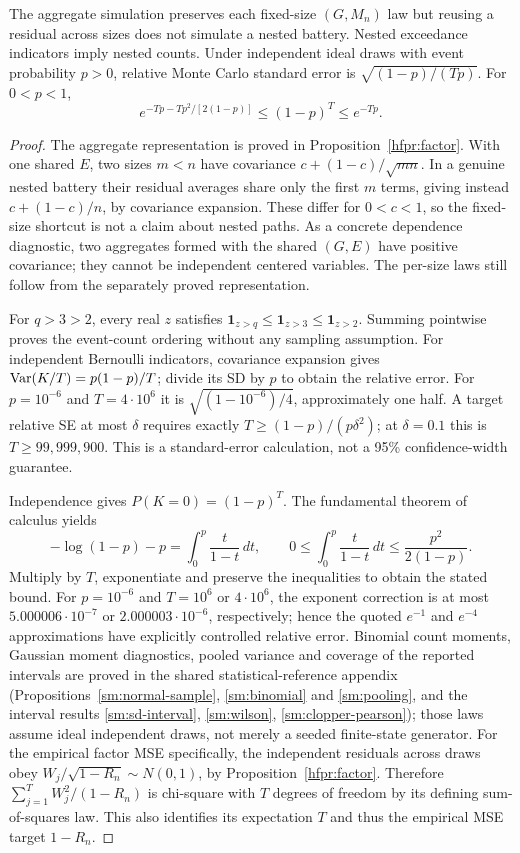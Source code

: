 \begin{proposition}
\label{hfpr:simulation}
The aggregate simulation preserves each fixed-size \((G,M_n)\) law but
reusing a residual across sizes does not simulate a nested battery.
Nested exceedance indicators imply nested counts. Under independent
ideal draws with event probability \(p>0\), relative Monte Carlo standard
error is \(\sqrt{(1-p)/(Tp)}\). For \(0<p<1\),
\[
 e^{-Tp-Tp^2/[2(1-p)]}\leq(1-p)^T\leq e^{-Tp}.
\]
\end{proposition}
\begin{proof}
The aggregate representation is proved in Proposition~\ref{hfpr:factor}.
With one shared \(E\), two sizes \(m<n\) have covariance
\(c+(1-c)/\sqrt{mn}\). In a genuine nested battery their residual
averages share only the first \(m\) terms, giving instead
\(c+(1-c)/n\), by covariance expansion. These differ for \(0<c<1\),
so the fixed-size shortcut is not a claim about nested paths. As a concrete
dependence diagnostic, two aggregates formed with the shared \((G,E)\)
have positive covariance; they cannot be independent centered variables.
The per-size laws still follow from the separately proved representation.

For \(q>3>2\), every real \(z\) satisfies
\(\mathbf1_{z>q}\leq\mathbf1_{z>3}\leq\mathbf1_{z>2}\).
Summing pointwise proves the event-count ordering without any sampling
assumption. For independent Bernoulli indicators, covariance expansion
gives \(\operatorname{Var}(K/T)=p(1-p)/T\); divide its SD by \(p\) to obtain the
relative error. For \(p=10^{-6}\) and \(T=4\cdot10^6\) it is
\(\sqrt{(1-10^{-6})/4}\), approximately one half. A target relative
SE at most \(\delta\) requires exactly
\(T\geq(1-p)/(p\delta^2)\); at \(\delta=0.1\) this is
\(T\geq99{,}999{,}900\). This is a standard-error calculation, not a
95\% confidence-width guarantee.

Independence gives \(P(K=0)=(1-p)^T\). The fundamental theorem of
calculus yields
\[
 -\log(1-p)-p=\int_0^p\frac{t}{1-t}\,dt,
 \qquad0\leq\int_0^p\frac{t}{1-t}\,dt
 \leq\frac{p^2}{2(1-p)}.
\]
Multiply by \(T\), exponentiate and preserve the inequalities to obtain
the stated bound. For \(p=10^{-6}\) and \(T=10^6\) or \(4\cdot10^6\),
the exponent correction is at most \(5.000006\cdot10^{-7}\) or
\(2.000003\cdot10^{-6}\), respectively; hence the quoted
\(e^{-1}\) and \(e^{-4}\) approximations have explicitly controlled
relative error. Binomial count moments, Gaussian moment diagnostics,
pooled variance and coverage of the reported intervals are proved in the
shared statistical-reference appendix (Propositions~\ref{sm:normal-sample},
\ref{sm:binomial} and \ref{sm:pooling}, and the interval results
\ref{sm:sd-interval}, \ref{sm:wilson}, \ref{sm:clopper-pearson}); those laws assume ideal independent
draws, not merely a seeded finite-state generator.
For the empirical factor MSE specifically, the independent residuals across
draws obey \(W_j/\sqrt{1-R_n}\sim N(0,1)\), by
Proposition~\ref{hfpr:factor}. Therefore
\(\sum_{j=1}^T W_j^2/(1-R_n)\) is chi-square with \(T\) degrees of
freedom by its defining sum-of-squares law. This also identifies its
expectation \(T\) and thus the empirical MSE target \(1-R_n\).
\end{proof}

